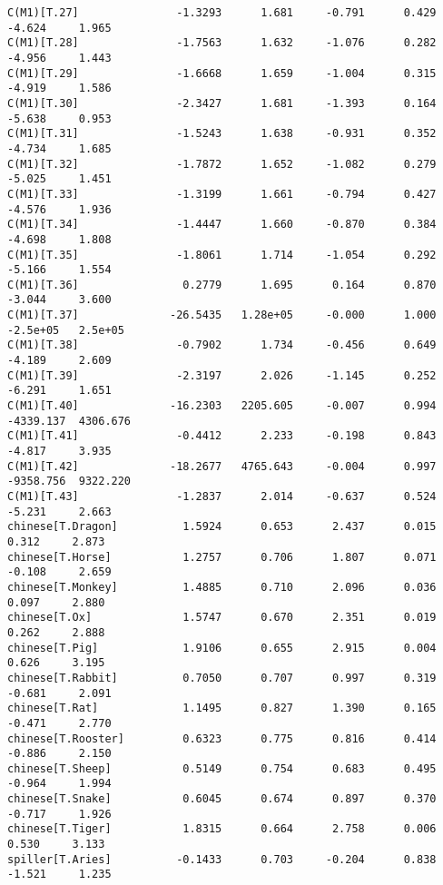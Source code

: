 \documentclass[12pt,fleqn]{article}\usepackage{../common}
\begin{document}
\begin{verbatim}
C(M1)[T.27]               -1.3293      1.681     -0.791      0.429        -4.624     1.965
C(M1)[T.28]               -1.7563      1.632     -1.076      0.282        -4.956     1.443
C(M1)[T.29]               -1.6668      1.659     -1.004      0.315        -4.919     1.586
C(M1)[T.30]               -2.3427      1.681     -1.393      0.164        -5.638     0.953
C(M1)[T.31]               -1.5243      1.638     -0.931      0.352        -4.734     1.685
C(M1)[T.32]               -1.7872      1.652     -1.082      0.279        -5.025     1.451
C(M1)[T.33]               -1.3199      1.661     -0.794      0.427        -4.576     1.936
C(M1)[T.34]               -1.4447      1.660     -0.870      0.384        -4.698     1.808
C(M1)[T.35]               -1.8061      1.714     -1.054      0.292        -5.166     1.554
C(M1)[T.36]                0.2779      1.695      0.164      0.870        -3.044     3.600
C(M1)[T.37]              -26.5435   1.28e+05     -0.000      1.000      -2.5e+05   2.5e+05
C(M1)[T.38]               -0.7902      1.734     -0.456      0.649        -4.189     2.609
C(M1)[T.39]               -2.3197      2.026     -1.145      0.252        -6.291     1.651
C(M1)[T.40]              -16.2303   2205.605     -0.007      0.994     -4339.137  4306.676
C(M1)[T.41]               -0.4412      2.233     -0.198      0.843        -4.817     3.935
C(M1)[T.42]              -18.2677   4765.643     -0.004      0.997     -9358.756  9322.220
C(M1)[T.43]               -1.2837      2.014     -0.637      0.524        -5.231     2.663
chinese[T.Dragon]          1.5924      0.653      2.437      0.015         0.312     2.873
chinese[T.Horse]           1.2757      0.706      1.807      0.071        -0.108     2.659
chinese[T.Monkey]          1.4885      0.710      2.096      0.036         0.097     2.880
chinese[T.Ox]              1.5747      0.670      2.351      0.019         0.262     2.888
chinese[T.Pig]             1.9106      0.655      2.915      0.004         0.626     3.195
chinese[T.Rabbit]          0.7050      0.707      0.997      0.319        -0.681     2.091
chinese[T.Rat]             1.1495      0.827      1.390      0.165        -0.471     2.770
chinese[T.Rooster]         0.6323      0.775      0.816      0.414        -0.886     2.150
chinese[T.Sheep]           0.5149      0.754      0.683      0.495        -0.964     1.994
chinese[T.Snake]           0.6045      0.674      0.897      0.370        -0.717     1.926
chinese[T.Tiger]           1.8315      0.664      2.758      0.006         0.530     3.133
spiller[T.Aries]          -0.1433      0.703     -0.204      0.838        -1.521     1.235

\end{verbatim}
\end{document}
